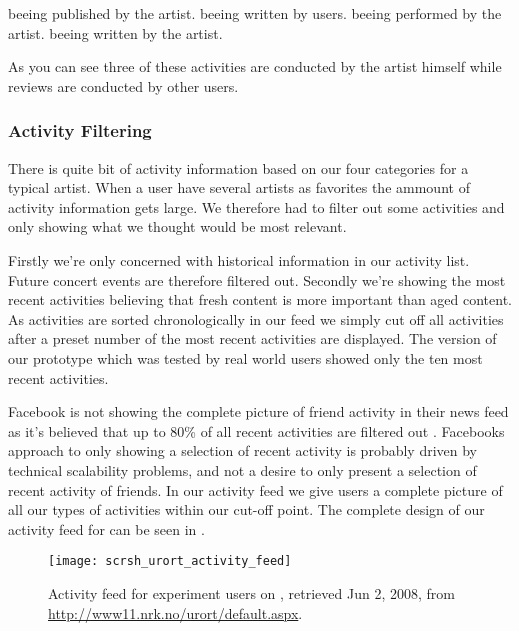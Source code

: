 \begin{items}
   beeing published by the artist.
   beeing written by users.
   beeing performed by the artist.
   beeing written by the artist.
\end{items}

As you can see three of these activities are conducted by the artist himself
while reviews are conducted by other users.

\subsubsection{Activity Filtering}

There is quite bit of activity information based on our four categories for
a typical artist. When a user have several artists as favorites the ammount of
activity information gets large. We therefore had to filter out some
activities and only showing what we thought would be most relevant.

Firstly we're only concerned with historical information in our activity list.
Future concert events are therefore filtered out. Secondly we're showing the
most recent activities believing that fresh content is more important than
aged content. As activities are sorted chronologically in our feed we simply
cut off all activities after a preset number of the most recent activities are
displayed. The version of our prototype which was tested by real world users
showed only the ten most recent activities.

Facebook is not showing the complete picture of friend activity in their news
feed as it's believed that up to 80\% of all recent activities are filtered
out \citep{mccrea08}.
Facebooks approach to only showing a selection of recent activity is
probably driven by technical scalability problems, and not a desire to only
present a selection of recent activity of friends. In our activity feed we
give users a complete picture of all our types of activities within our
cut-off point.
The complete design of our activity feed for \urort{} can be seen in
.

\begin{figure}
  \centering
  \texttt{[image: scrsh\_urort\_activity\_feed]}
  \caption[\urort{} Activity Feed]{
    Activity feed for experiment users on \urort{},
    retrieved Jun 2, 2008, from
    \url{http://www11.nrk.no/urort/default.aspx}.
  }
  \label{figure:scrsh.urort.activity.feed}
\end{figure}

